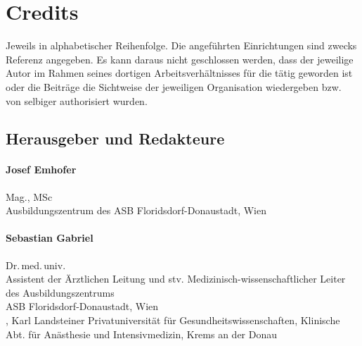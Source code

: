 \section{Credits}
\begin{raggedright}%

{%
%
\itshape%
\begin{center}
{Jeweils in alphabetischer Reihenfolge. Die angeführten Einrichtungen
sind zwecks Referenz angegeben. Es kann daraus nicht geschlossen werden, dass
der jeweilige Autor im Rahmen seines dortigen Arbeitsverhältnisses für die
{\AASS} tätig geworden ist oder die Beiträge die Sichtweise der jeweiligen
Organisation wiedergeben bzw. von selbiger authorisiert wurden.}
\end{center}}

\subsection*{Herausgeber und Redakteure}

  \begin{minipage}{\linewidth}\raggedright
    \paragraph{Josef Emhofer}
    Mag., MSc
    \\[.25\baselineskip]
    \noindent{}Ausbildungszentrum des {\color{AltBlueDark}ASB
    Florids\-dorf-Donaustadt}, Wien
  \end{minipage}

  \bigskip

  \begin{minipage}{\linewidth}\raggedright
    \paragraph{Sebastian Gabriel}
    Dr.\,med.\,univ.
    \\[.25\baselineskip]
    \noindent{}Assistent der Ärztlichen Leitung 
    und stv. Medizinisch-wissenschaftlicher Leiter des Ausbildungszentrums\\ 
    {\color{AltBlueDark}ASB Florids\-dorf-Donau\-stadt}, 
    Wien
    \\[.25\baselineskip]
    , 
    Karl Landsteiner Privatuniversität für Gesundheitswissenschaften,
    Klinische Abt. für Anästhesie und Intensivmedizin, 
    Krems an der Donau
  \end{minipage}


\end{raggedright}
